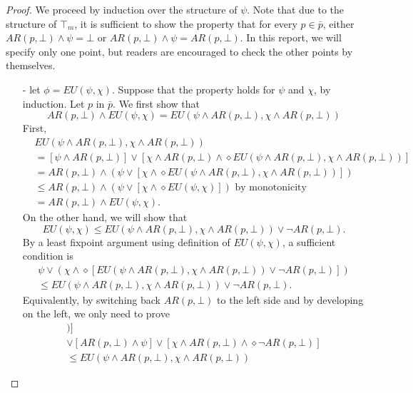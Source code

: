 \documentclass[11pt]{article}
\newcommand{\ARp}{{AR (p,\bot)}}
\theoremstyle{definition}
\begin{document}
\begin{proof}
    We proceed by induction over the structure of $\psi$. Note that due to the structure of $\top_m$, 
    it is sufficient to show the property that for every $p\in\bar{p}$, either $\ARp\wedge\psi=\bot$ or $\ARp\wedge\psi=\ARp$.
    In this report, we will specify only one point, but readers are encouraged to check the other points by themselves.
    \begin{itemize}
        \setlength\itemsep{0em}
        \item[-] let $\phi = EU(\psi,\chi)$. Suppose that the property holds for $\psi$ and $\chi$, by induction. Let $p$ in $\bar{p}$. We first show that \[AR(p,\bot)\wedge EU(\psi,\chi)=EU(\psi\wedge AR(p,\bot),\chi\wedge AR(p,\bot))\]
            First, 
            \begin{align*}
                &EU(\psi\wedge AR(p,\bot),\chi\wedge AR(p,\bot))\\
                &=[\psi\wedge\ARp]\vee[\chi\wedge\ARp\wedge\diamond EU(\psi\wedge AR(p,\bot),\chi\wedge AR(p,\bot))]\\
                &=\ARp\wedge(\psi\vee[\chi\wedge \diamond EU(\psi\wedge AR(p,\bot),\chi\wedge AR(p,\bot))])\\
                &\leq\ARp\wedge(\psi\vee[\chi\wedge \diamond EU(\psi,\chi)])\mbox{ by monotonicity}\\
                &=\ARp\wedge EU(\psi,\chi).
            \end{align*}
            On the other hand, we will show that \[EU(\psi,\chi)\leq EU(\psi\wedge\ARp,\chi\wedge\ARp)\vee\neg\ARp.\] 
            By a least fixpoint argument using definition of $EU(\psi,\chi)$, a sufficient condition is 
            \begin{multline*}
                \psi\vee(\chi\wedge\diamond [EU(\psi\wedge\ARp,\chi\wedge\ARp)\vee\neg\ARp])\\
                \leq EU(\psi\wedge\ARp,\chi\wedge\ARp)\vee\neg\ARp.
            \end{multline*}
            Equivalently, by switching back $\ARp$ to the left side and by developing on the left, we only need to prove
            \begin{multline*}
                [\ARp\wedge(\psi\vee[\chi\wedge\diamond EU(\psi\wedge\ARp,\chi\wedge\ARp)])]\\
                \vee[\ARp\wedge\psi]\vee[\chi\wedge\ARp\wedge\diamond\neg\ARp]\\
                \leq EU(\psi\wedge\ARp,\chi\wedge\ARp)
            \end{multline*}

\end{itemize}
\end{proof}
\end{document}

